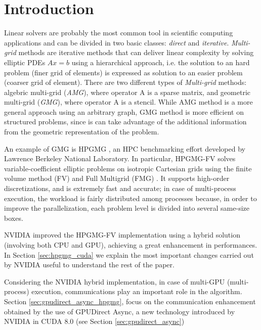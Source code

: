 \documentclass[conference]{IEEEtran}
\begin{document}
\section{Introduction}\label{sec:introduction}
Linear solvers are probably the most common tool in scientific computing applications and can be divided in two basic classes: \emph{direct} and \emph{iterative}.
\emph{Multi-grid} methods are iterative methods that can deliver linear complexity by solving elliptic PDEs $Ax=b$ using a hierarchical approach, i.e. the solution to an hard problem (finer grid of elements) is expressed as solution to an easier problem (coarser grid of element).
There are two different types of \emph{Multi-grid} methods: algebric multi-grid (\emph{AMG}), where operator A is a sparse matrix, and geometric multi-grid (\emph{GMG}), where operator A is a stencil. While AMG method is a more general approach using an arbitrary graph, GMG method is more efficient on structured problems, since is can take advantage of the additional information from the geometric representation of the problem.

An example of GMG is HPGMG \cite{HPGMG}, an HPC benchmarking effort developed by Lawrence Berkeley National Laboratory. In particular, HPGMG-FV solves variable-coefficient elliptic problems on isotropic Cartesian grids using the finite volume method (FV) \cite{finitevolume} and Full Multigrid (FMG) \cite{fullmultigrid}. It supports high-order discretizations, and is extremely fast and accurate; in case of multi-process execution, the workload is fairly distributed among processes because, in order to improve the parallelization, each problem level is divided into several same-size boxes.

NVIDIA improved the HPGMG-FV implementation \cite{HPGMG_NVIDIA} using a hybrid solution (involving both CPU and GPU), achieving a great enhancement in performances. In Section \ref{sec:hpgmg_cuda} we explain the most important changes carried out by NVIDIA useful to understand the rest of the paper.

Considering the NVIDIA hybrid implementation, in case of multi-GPU (multi-process) execution, communications play an important role in the algorithm. Section \ref{sec:gpudirect_async_hpgmg}, focus on the communication enhancement obtained by the use of GPUDirect Async, a new technology introduced by NVIDIA in CUDA 8.0 (see Section \ref{sec:gpudirect_async})
\end{document}
